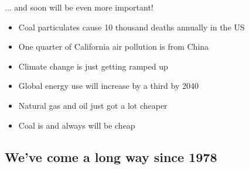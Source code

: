 \documentclass{beamer}
\begin{document}
    \begin{frame}{... and soon will be even more important!}

        \begin{itemize}

            \item Coal particulates cause 10 thousand deaths annually in the US
            \pause
            \item One quarter of California air pollution is from China
            \pause
            \item Climate change is just getting ramped up
            \pause

            \vspace{2em}

            \item Global energy use will increase by a third by 2040
            \pause
            \item Natural gas and oil just got a lot cheaper
            \pause
            \item Coal is and always will be cheap

        \end{itemize}

    \end{frame}

\subsection{We've come a long way since 1978}
\end{document}
